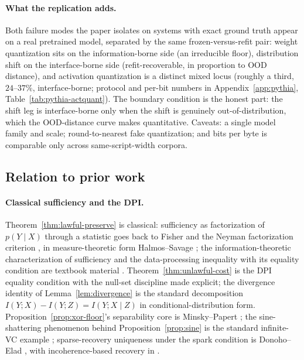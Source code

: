\documentclass[twocolumn,10pt]{article}
\theoremstyle{definition}
\theoremstyle{remark}
\begin{document}
\paragraph{What the replication adds.} Both failure modes the paper isolates on
systems with exact ground truth appear on a real pretrained model, separated by
the same frozen-versus-refit pair: weight quantization sits on the
information-borne side (an irreducible floor), distribution shift on the
interface-borne side (refit-recoverable, in proportion to OOD distance), and
activation quantization is a distinct mixed locus (roughly a third,
$24$--$37\%$, interface-borne; protocol and per-bit numbers in
Appendix~\ref{app:pythia}, Table~\ref{tab:pythia-actquant}). The boundary
condition is the honest part: the shift leg is
interface-borne only when the shift is genuinely out-of-distribution, which the
OOD-distance curve makes quantitative. Caveats: a single model family and scale;
round-to-nearest fake quantization; and bits per byte is comparable only across
same-script-width corpora.

\subsection{Relation to prior work}
\label{sec:related}

\paragraph{Classical sufficiency and the DPI.}
Theorem~\ref{thm:lawful-preserve} is classical: sufficiency as
factorization of $p(Y \mid X)$ through a statistic goes back to Fisher
\cite{fisher} and the Neyman factorization criterion \cite{neyman}, in
measure-theoretic form Halmos--Savage \cite{halmossavage}; the
information-theoretic characterization of sufficiency and the
data-processing inequality with its equality condition are textbook
material \cite{coverthomas,kullback,polyanskiywu}.
Theorem~\ref{thm:unlawful-cost} is the DPI equality condition with the
null-set discipline made explicit; the divergence identity of
Lemma~\ref{lem:divergence} is the standard decomposition
$I(Y; X) - I(Y; Z) = I(Y; X \mid Z)$ in conditional-distribution form.
Proposition~\ref{prop:xor-floor}'s separability core is Minsky--Papert
\cite{minskypapert}; the sine-shattering phenomenon behind
Proposition~\ref{prop:sine} is the standard infinite-VC example
\cite{vapnik}; sparse-recovery uniqueness under the spark condition is
Donoho--Elad \cite{donohoelad}, with incoherence-based recovery in
\cite{tropp}.
\end{document}

